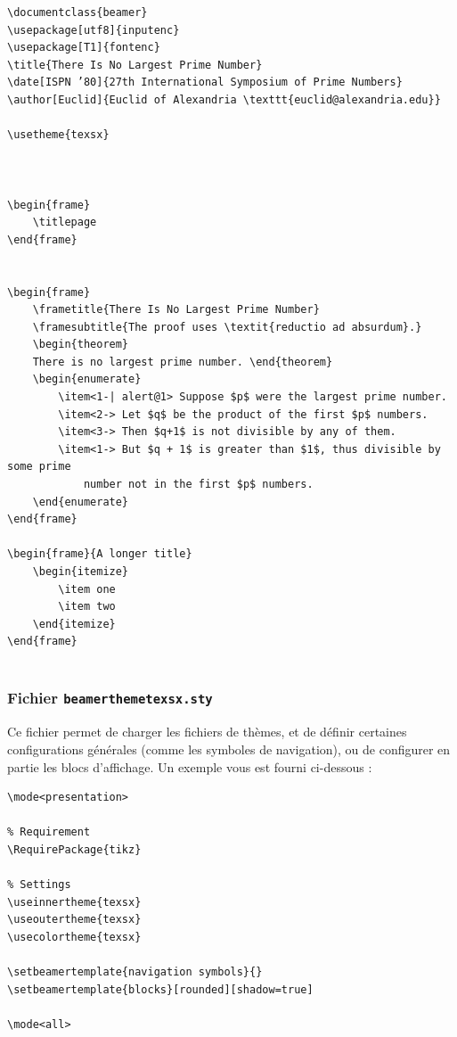 \begin{lstlisting}[language={[LaTeX]TeX}]
\documentclass{beamer}
\usepackage[utf8]{inputenc}
\usepackage[T1]{fontenc}
\title{There Is No Largest Prime Number}
\date[ISPN ’80]{27th International Symposium of Prime Numbers}
\author[Euclid]{Euclid of Alexandria \texttt{euclid@alexandria.edu}}

\usetheme{texsx}



\begin{frame}
	\titlepage
\end{frame}


\begin{frame} 
	\frametitle{There Is No Largest Prime Number} 
	\framesubtitle{The proof uses \textit{reductio ad absurdum}.} 
	\begin{theorem}
	There is no largest prime number. \end{theorem} 
	\begin{enumerate} 
		\item<1-| alert@1> Suppose $p$ were the largest prime number. 
		\item<2-> Let $q$ be the product of the first $p$ numbers. 
		\item<3-> Then $q+1$ is not divisible by any of them. 
		\item<1-> But $q + 1$ is greater than $1$, thus divisible by some prime
			number not in the first $p$ numbers.
	\end{enumerate}
\end{frame}

\begin{frame}{A longer title}
	\begin{itemize}
		\item one
		\item two
	\end{itemize}
\end{frame}


\end{lstlisting}

\subsubsection{Fichier \texttt{beamerthemetexsx.sty}}
Ce fichier permet de charger les fichiers de thèmes, et de définir certaines configurations générales (comme les symboles de navigation), ou de configurer en partie les blocs d'affichage. Un exemple vous est fourni ci-dessous :

\begin{lstlisting}[language={[LaTeX]TeX}]
\mode<presentation>

% Requirement
\RequirePackage{tikz}

% Settings
\useinnertheme{texsx}
\useoutertheme{texsx}
\usecolortheme{texsx}

\setbeamertemplate{navigation symbols}{}
\setbeamertemplate{blocks}[rounded][shadow=true]  

\mode<all>
\end{lstlisting}

